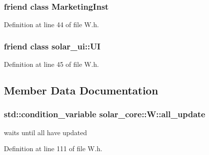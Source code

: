 \subsubsection[{Marketing\+Inst}]{\setlength{\rightskip}{0pt plus 5cm}friend class {\bf Marketing\+Inst}\hspace{0.3cm}{\ttfamily [friend]}}\label{classsolar__core_1_1_w_ac01e54f17f927af30196b551d235d7ba}


Definition at line 44 of file W.\+h.

\hypertarget{classsolar__core_1_1_w_a8f3690c82c493af3a66f999410fe891d}{}
\subsubsection[{solar\+\_\+ui\+::\+U\+I}]{\setlength{\rightskip}{0pt plus 5cm}friend class {\bf solar\+\_\+ui\+::\+U\+I}\hspace{0.3cm}{\ttfamily [friend]}}\label{classsolar__core_1_1_w_a8f3690c82c493af3a66f999410fe891d}


Definition at line 45 of file W.\+h.



\subsection{Member Data Documentation}
\hypertarget{classsolar__core_1_1_w_aa6cba0dba8a566978e51fb4204aac4b9}{}
\subsubsection[{all\+\_\+update}]{\setlength{\rightskip}{0pt plus 5cm}std\+::condition\+\_\+variable solar\+\_\+core\+::\+W\+::all\+\_\+update}\label{classsolar__core_1_1_w_aa6cba0dba8a566978e51fb4204aac4b9}
waits until all have updated 

Definition at line 111 of file W.\+h.

\hypertarget{classsolar__core_1_1_w_acf6e7dd195573ba04b406cde2e5b80fb}{}
